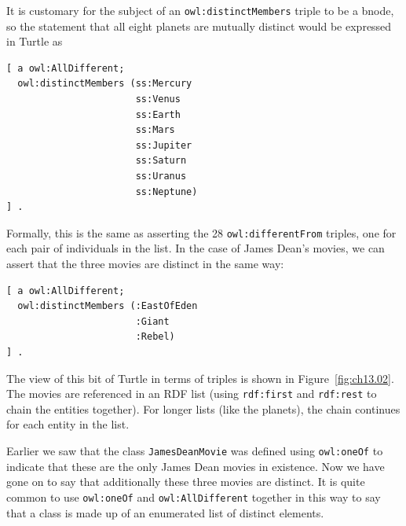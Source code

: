 It is customary for the subject of an \texttt{owl:distinctMembers} triple to be a
bnode, so the
statement that all eight planets are mutually distinct would be
expressed in Turtle as

\begin{lstlisting}
[ a owl:AllDifferent;
  owl:distinctMembers (ss:Mercury
                       ss:Venus
                       ss:Earth
                       ss:Mars
                       ss:Jupiter
                       ss:Saturn
                       ss:Uranus
                       ss:Neptune)
] .
\end{lstlisting}

Formally, this is the same as asserting the 28 \texttt{owl:differentFrom}
triples, one for each pair of individuals in the list. In the case of
James Dean's movies, we can assert that the three movies are distinct in
the same way:

\begin{lstlisting}
[ a owl:AllDifferent;
  owl:distinctMembers (:EastOfEden
                       :Giant
                       :Rebel)
] .
\end{lstlisting}

The view of this bit of Turtle in terms of triples is shown in Figure~\ref{fig:ch13.02}.
The movies are referenced in an RDF list (using \texttt{rdf:first} and \texttt{rdf:rest}
to chain the entities together). For longer lists (like the planets),
the chain continues for each entity in the list.

Earlier we saw that the class \texttt{JamesDeanMovie} was defined using \texttt{owl:oneOf}
to indicate that these are the only James Dean movies in existence. Now
we have gone on to say that additionally these three movies are
distinct. It is quite common to use \texttt{owl:oneOf} and \texttt{owl:AllDifferent}
together in this way to say that a class is made up of an enumerated
list of distinct elements.


